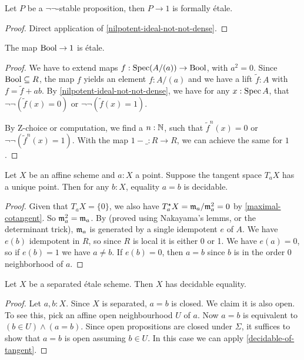 \begin{proposition}%
  Let $P$ be a $\neg\neg$-stable proposition,
  then $P\to 1$ is formally étale.
\end{proposition}

\begin{proof}
  Direct application of \cref{nilpotent-ideal-not-not-dense}.
\end{proof}

\begin{proposition}%
  The map $\mathrm{Bool}\to 1$ is étale.
\end{proposition}

\begin{proof}
  We have to extend maps $f:\operatorname{Spec} (A/(a))\to \mathrm{Bool}$, with $a^2=0$.
  Since $\mathrm{Bool}\subseteq R$, the map $f$ yields an element $f:A/(a)$
  and we have a lift $\tilde{f}:A$ with $f=\tilde{f}+ab$.
  By \cref{nilpotent-ideal-not-not-dense},
  we have for any $x:\operatorname{Spec} A$, that $\neg\neg(\tilde{f}(x)=0)$ or $\neg\neg(\tilde{f}(x)=1)$.

  By Z-choice or computation, we find a $n:\mathbb{N}$,
  such that $\tilde{f}^n(x)=0$ or $\neg\neg(\tilde{f}^n(x)=1)$.
  With the map $1-\_:R\to R$, we can achieve the same for $1$.
\end{proof}

\begin{proposition}%
	\label{decidable-of-tangent}
	Let $X$ be an affine scheme and $a : X$ a point. Suppose the tangent space
	$T_a X$ has a unique point. Then for any $b : X$, equality $a = b$ is decidable.
\end{proposition}

\begin{proof}
	Given that $T_a X = \{0\}$, we also have $T^\star_a X = \mathfrak{m}_a / \mathfrak{m}_a^2 = 0$
	by \cref{maximal-cotangent}.
	So $\mathfrak{m}_a^2 = \mathfrak{m}_a$. By \cite[Lemma II.4.6]{lombardi-quitte}
	(proved using Nakayama's lemms, or the determinant trick), $\mathfrak{m}_a$ is generated
	by a single idempotent $e$ of $A$. We have $e(b)$ idempotent in $R$,
	so since $R$ is local it is either 0 or 1. We have $e(a) = 0$, so if $e(b) = 1$
	we have $a \ne b$. If $e(b) = 0$, then $a = b$ since $b$ is in the order 0
	neighborhood of $a$.
\end{proof}

\begin{proposition}%
	Let $X$ be a separated \'{e}tale scheme. Then $X$ has decidable equality.
\end{proposition}

\begin{proof}
	Let $a, b : X$. Since $X$ is separated, $a = b$ is closed.
	We claim it is also open.
	To see this, pick an affine open neighbourhood $U$ of $a$.
	Now $a = b$ is equivalent to $(b \in U) \wedge (a = b)$.
	Since open propositions are closed under $\Sigma$,
	it suffices to show that $a = b$ is open assuming $b \in U$.
	In this case we can apply \cref{decidable-of-tangent}.
\end{proof}


